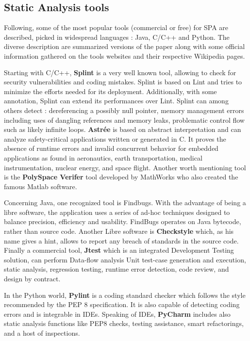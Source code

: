 \subsection{Static Analysis tools}
Following, some of the most popular tools (commercial or free) for SPA are described, picked in widespread languages : Java, C/C++ and Python. The diverse description are summarized versions of the \cite{Gomes2009} paper along with some official information gathered on the tools websites and their respective Wikipedia pages.

Starting with C/C++, \textbf{Splint} is a very well known tool, allowing to check for security vulnerabilities and coding mistakes. Splint is based on Lint and tries to minimize the efforts needed for its deployment. Additionally, with some annotation, Splint can extend its performances over Lint. Splint can among others detect : dereferencing a possibly null pointer, memory management errors including uses of dangling references and memory leaks, problematic control flow such as likely infinite loops. \textbf{Astrée} is based on abstract interpretation and can analyze safety-critical applications written or generated in C. It proves the absence of run­time errors and invalid concurrent behavior for embedded applications as found in aeronautics, earth transportation, medical instrumentation, nuclear energy, and space flight. Another worth mentioning tool is the \textbf{PolySpace Verifer} tool developed by MathWorks who also created the famous Matlab software. 

Concerning Java, one recognized tool is Findbugs. With the advantage of being a \gls{libre} software, the application uses a series of ad-hoc techniques designed to balance precision, efficiency and usability. FindBugs operates on Java bytecode, rather than source code. Another Libre software is \textbf{Checkstyle} which, as his name gives a hint, allows to report any breach of standards in the source code. Finally a commercial tool, \textbf{Jtest} which is an integrated Development Testing solution, can perform Data-flow analysis Unit test-case generation and execution, static analysis, regression testing, runtime error detection, code review, and design by contract.

In the Python world, \textbf{Pylint} is a coding standard checker which follows the style recommended by the PEP 8 specification. It is also capable of detecting coding errors and is integrable in IDEs. Speaking of IDEs, \textbf{PyCharm} includes also static analysis functions like PEP8 checks, testing assistance, smart refactorings, and a host of inspections.

